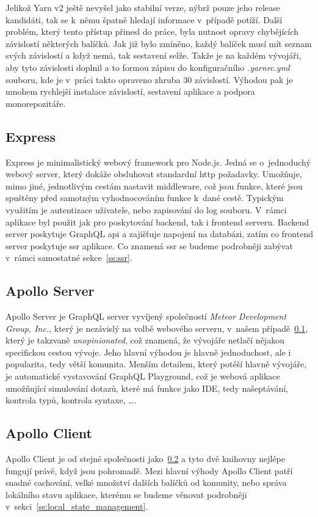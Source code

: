 Jelikož Yarn v2 ještě nevyšel jako stabilní verze, nýbrž pouze jeho release kandidáti, tak se k~němu špatně hledají informace v~případě potíží. Další problém, který tento přístup přinesl do práce, byla nutnost opravy chybějících závislostí některých balíčků. Jak již bylo zmíněno, každý balíček musí mít seznam svých závislostí a když nemá, tak sestavení selže. Takže je na každém vývojáři, aby tyto závislosti doplnil a to formou zápisu do konfiguračního \emph{.yarnrc.yml} souboru, kde je v~práci takto opraveno zhruba 30 závislostí. Výhodou pak je mnohem rychlejší instalace závislostí, sestavení aplikace a podpora monorepozitáře.

\subsection{Express}
\label{ss:express}
Express je minimalistický webový framework pro Node.js. Jedná se o~jednoduchý webový server, který dokáže obsluhovat standardní http požadavky. Umožňuje, mimo jiné, jednotlivým cestám nastavit middleware, což jsou funkce, které jsou spuštěny před samotným vyhodnocováním funkce k~dané cestě. Typickým využitím je autentizace uživatele, nebo zapisování do log souboru. V~rámci aplikace byl použit jak pro poskytování backend, tak i frontend serveru. Backend server poskytuje GraphQL \acrshort{api} a zajišťuje napojení na databázi, zatím co frontend server poskytuje \acrfull{ssr} aplikace. Co znamená \acrshort{ssr} se budeme podrobněji zabývat v~rámci samostatné sekce~\ref{ss:ssr}.

\subsection{Apollo Server}
\label{ss:apollo_server}
Apollo Server je GraphQL server vyvíjený společností \emph{Meteor Development Group, Inc.}, který je nezávislý na volbě webového serveru, v~našem případě~\ref{ss:express}, který je takzvaně \emph{unopinionated}, což znamená, že vývojáře netlačí nějakou specifickou cestou vývoje. Jeho hlavní výhodou je hlavně jednoduchost, ale i popularita, tedy větší komunita. Menším detailem, který potěší hlavně vývojáře, je automatické vystavování GraphQL Playground, což je webová aplikace umožňující simulování dotazů, které má funkce jako IDE, tedy našeptávání, kontrola typů, kontrola syntaxe, \ldots{}.

\subsection{Apollo Client}
\label{ss:apollo_client}
Apollo Client je od stejné společnosti jako~\ref{ss:apollo_server} a tyto dvě knihovny nejlépe fungují právě, když jsou pohromadě. Mezi hlavní výhody Apollo Client patří snadné cachování, velké množství dalších balíčků od komunity, nebo správa lokálního stavu aplikace, kterému se budeme věnovat podrobněji v~sekci~\ref{ss:local_state_management}.

